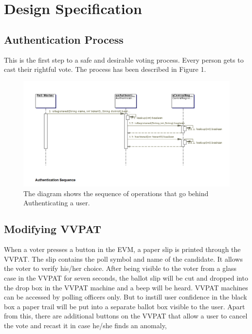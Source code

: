 \documentclass[a4paper,12pt]{extarticle}
\begin{document}
            
\section{Design Specification}


\subsection{Authentication Process}
This is the first step to a safe and desirable voting process. Every person gets to cast their rightful vote. The process has been described in Figure 1.
\begin{figure}
\centering
\includegraphics[width=1\textwidth]{Authentication.jpeg}
\caption{\label{fig:Auth}The diagram shows the sequence of operations that go behind Authenticating a user.}
\end{figure}

\subsection{Modifying VVPAT}
When a voter presses a button in the EVM, a paper slip is printed through the VVPAT. The slip contains the poll symbol and name of the candidate. It allows the voter to verify his/her choice.  After being visible to the voter from a glass case in the VVPAT for seven seconds, the ballot slip will be cut and dropped into the drop box in the VVPAT machine and a beep will be heard. VVPAT machines can be accessed by polling officers only. But to instill user confidence in the black box a paper trail will be put into a separate ballot box visible to the user. Apart from this, there are additional buttons on the VVPAT that allow a user to cancel the vote and recast it in case he/she finds an anomaly,
\end{document}
